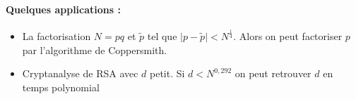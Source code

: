 \documentclass[12pt,a4paper]{report}
\begin{document}
\paragraph{Quelques applications :\\}
\begin{itemize}
\item La factorisation $N=pq$ et $\tilde{p}$ tel que $\mid p - \tilde{p} \mid < N^{\frac{1}{4}} $. Alors on peut factoriser $p$ par l'algorithme de Coppersmith.
\item Cryptanalyse de RSA avec $d$ petit. Si $d < N^{0,292}$ on peut retrouver $d$ en temps polynomial
\end{itemize}
\end{document}
